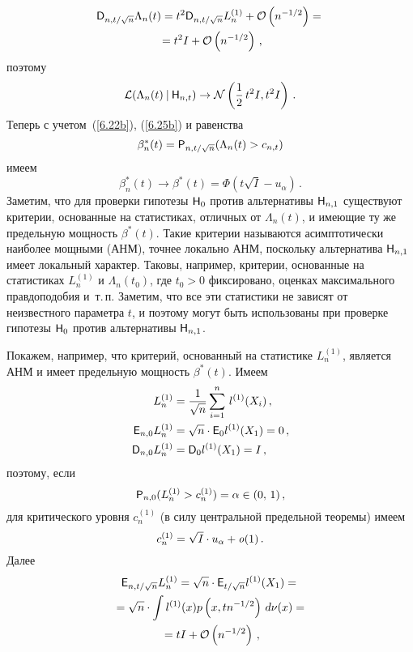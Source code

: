 \begin{multicols}{2}
\noindent
\begin{multline*}
{{\sf D}}_{n,t/\sqrt{n}}\Lambda_n(t) =
t^2{{\sf D}}_{n,t/\sqrt{n}}L_n^{(1)}+
{\cal O}\left (n^{-1/2}\right )={}\\
{}= t^2I+{\cal O}\left (n^{-1/2}\right )\,,
\end{multline*}
поэтому
\begin{equation}
{\cal L}(\Lambda_n(t)\:|\:{\sf H}_{n,t})\to {\cal N}
\left (\displaystyle\frac{\displaystyle 1\mathstrut}{\displaystyle 2\mathstrut}\,t^2I,t^2I\right )\,.\label{6.25b}
\end{equation}
Теперь с учетом~(\ref{6.22b}), (\ref{6.25b})  и равенства
$$
\beta_n^*(t) = {{\sf P}}_{n,t/\sqrt{n}}(\Lambda_n(t)>c_{n,t})
$$
имеем
\begin{equation}
\beta_n^*(t)\to \beta^*(t)= \Phi\left (
t\sqrt{I}-u_{\alpha}\right )\,.
\label{6.26b}
\end{equation}
Заметим,
что для проверки гипотезы ${\sf H}_0$ против альтернативы ${\sf H}_{n,1}$
существуют критерии, основанные на статистиках, отличных
от $\Lambda_n(t)$, и имеющие ту же предельную мощность
$\beta^*(t)$. Такие критерии называются асимптотически наиболее
мощными (АНМ), точнее локально АНМ, поскольку альтернатива
${\sf H}_{n,1}$ имеет локальный характер. Таковы, например, критерии,
основанные на статистиках $L_n^{(1)}$ и $\Lambda_n(t_0)$, где
$t_0 > 0$ фиксировано, оценках максимального правдоподобия и~т.\,п.
Заметим, что все эти статистики не зависят от неизвестного
параметра $t$, и поэтому могут быть использованы при проверке
гипотезы ${\sf H}_0$ против альтернативы ${\sf H}_{n,1}$.

Покажем, например, что критерий, основанный на статистике
$L_n^{(1)}$, является АНМ и имеет предельную мощность
$\beta^*(t)$. Имеем
\begin{align*}
L_n^{(1)} &= \displaystyle\frac{\displaystyle 1\mathstrut}{\displaystyle \sqrt{n}\mathstrut}\sum_{i=1}^{n}\,l^{(1)}(X_i)\,, \\
{{\sf E}}_{n,0}L_n^{(1)}& = \sqrt{n}\cdot {{\sf E}}_0l^{(1)}(X_1) = 0\,, \\
{{\sf D}}_{n,0}L_n^{(1)}& = {{\sf D}}_0l^{(1)}(X_1) = I\,,
\end{align*}
поэтому, если
$$
{{\sf P}}_{n,0}(L_n^{(1)}>c_n^{(1)}) = \alpha \in (0,\,1)\,,
$$
для критического уровня $c_n^{(1)}$ (в силу
центральной предельной теоремы) имеем
\begin{equation}
c_n^{(1)} =
\sqrt{I}\cdot u_{\alpha}+{\it o}(1)\,.
\label{6.27b}
\end{equation}
Далее
\begin{multline*}
{{\sf E}}_{n,t/\sqrt{n}}L_n^{(1)}=
\sqrt{n}\cdot {{\sf E}}_{t/\sqrt{n}}l^{(1)}(X_1) = {}\\
{}= \sqrt{n}\cdot \int
l^{(1)}(x)p\left (x,tn^{-1/2}\right )\,d\nu(x)={}\\
{} = tI + {\cal O}\left (n^{-1/2}\right )\,,
\end{multline*}


\end{multicols}
